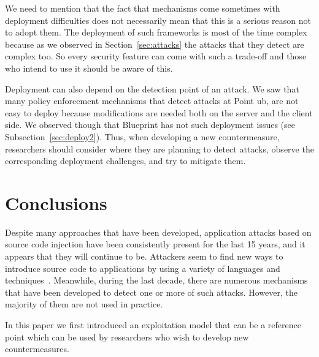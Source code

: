 \documentclass[conference]{IEEEtran}
\begin{document}
We need to mention that the fact that mechanisms come sometimes with
deployment difficulties does not necessarily mean that this is a
serious reason not to adopt them. The deployment of such frameworks is
most of the time complex because as we observed in
Section~\ref{sec:attacks} the attacks that they detect are complex
too. So every security feature can come with such a trade-off and
those who intend to use it should be aware of this.

Deployment can also depend on the detection point of an attack. We saw
that many policy enforcement mechanisms that detect attacks at Point
{\sc ub}, are not easy to deploy because modifications are needed both
on the server and the client side. We observed though that Blueprint
has not such deployment issues (see Subsection~\ref{sec:deploy2}).
Thus, when developing a new countermeasure, researchers should
consider where they are planning to detect attacks, observe the
corresponding deployment challenges, and try to mitigate them.


\section{Conclusions}
\label{sec:conclusion}

Despite many approaches that have been developed,
application attacks based on source code injection
have been consistently present for the last 15 years,
and it appears that they will continue to be.
Attackers seem to find new ways to introduce
source code to applications by using a variety of
languages and techniques~\cite{HNSHS12,DKH14}.
Meanwhile, during the last decade, there are
numerous mechanisms that have been developed to
detect one or more of such attacks. However,
the majority of them are not used in practice.

In this paper we first introduced an exploitation model
that can be a reference point which can be used by
researchers who wish to develop new countermeasures.

\end{document}

